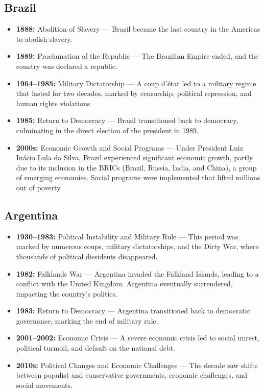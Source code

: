 \documentclass[a4paper,12pt]{book}
\begin{document}
\subsection{Brazil}
\label{subsec:brazil}
\begin{itemize}
    \item \textbf{1888:} Abolition of Slavery — Brazil became the last country in the Americas to abolish slavery.
    \item \textbf{1889:} Proclamation of the Republic — The Brazilian Empire ended, and the country was declared a republic.
    \item \textbf{1964–1985:} Military Dictatorship — A coup d'état led to a military regime that lasted for two decades, marked by censorship, political repression, and human rights violations.
    \item \textbf{1985:} Return to Democracy — Brazil transitioned back to democracy, culminating in the direct election of the president in 1989.
    \item \textbf{2000s:} Economic Growth and Social Programs — Under President Luiz Inácio Lula da Silva, Brazil experienced significant economic growth, partly due to its inclusion in the BRICs (Brazil, Russia, India, and China), a group of emerging economies. Social programs were implemented that lifted millions out of poverty.
\end{itemize}

\subsection{Argentina}
\label{subsec:argentina}
\begin{itemize}
    \item \textbf{1930–1983:} Political Instability and Military Rule — This period was marked by numerous coups, military dictatorships, and the Dirty War, where thousands of political dissidents disappeared.
    \item \textbf{1982:} Falklands War — Argentina invaded the Falkland Islands, leading to a conflict with the United Kingdom. Argentina eventually surrendered, impacting the country’s politics.
    \item \textbf{1983:} Return to Democracy — Argentina transitioned back to democratic governance, marking the end of military rule.
    \item \textbf{2001–2002:} Economic Crisis — A severe economic crisis led to social unrest, political turmoil, and default on the national debt.
    \item \textbf{2010s:} Political Changes and Economic Challenges — The decade saw shifts between populist and conservative governments, economic challenges, and social movements.
\end{itemize}
\end{document}
